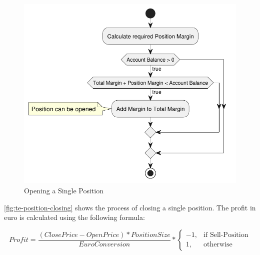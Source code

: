 \begin{figure}[H]
    \centering
    \includegraphics[width=\textwidth]{images/trading-engine/position-opening.pdf}
    \caption{Opening a Single Position}
    \label{fig:te-position-opening}
\end{figure}

\autoref{fig:te-position-closing} shows the process of closing a single position.
The profit in euro is calculated using the following formula:

\[
    Profit = \frac{(ClosePrice - OpenPrice) * PositionSize}{EuroConversion} *
    \begin{cases}
        -1,& \text{if Sell-Position}\\
        1,              & \text{otherwise}
    \end{cases}
\]

